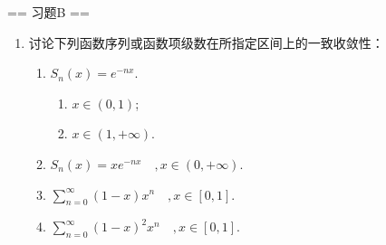 == 习题B ==
\begin{enumerate}
    \item[1.]讨论下列函数序列或函数项级数在所指定区间上的一致收敛性：
    \begin{enumerate}
        \item[(a)]\(\displaystyle S_n(x) = e^{-nx}\).
            \begin{enumerate}
                \item[i.]\(x \in (0, 1)\);
                \item[ii.]\(x \in (1, +\infty)\).
            \end{enumerate}
        \item[(b)]\(S_n(x) = xe^{-nx}\quad,x \in (0, +\infty)\).
        \item[(c)]\(\displaystyle\sum_{n=0}^{\infty} (1-x)x^n\quad ,x \in [0, 1]\).
        \item[(d)]\(\displaystyle\sum_{n=0}^{\infty} (1-x)^2 x^n\quad, x \in [0, 1]\).
    \end{enumerate}
\end{enumerate}
